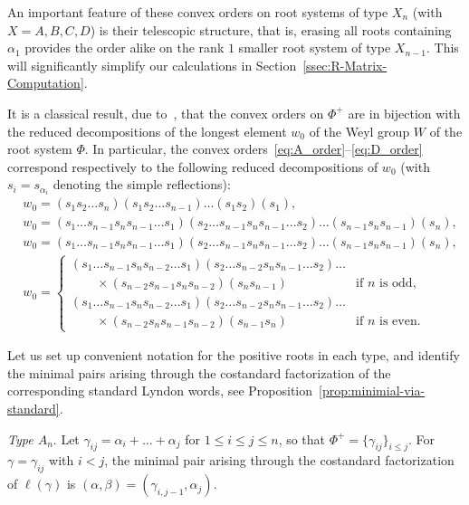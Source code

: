 \documentclass[pdftex]{sigma}
\numberwithin{equation}{section}
\begin{document}
\begin{Remark}\label{rem:tower-like}
An important feature of these convex orders on root systems of type $X_n$ (with $X=A,B,C,D$) is their telescopic structure, that is, erasing all roots containing $\alpha_1$ provides the order alike on the rank $1$ smaller root system of type $X_{n-1}$. This will significantly simplify our calculations in Section~\ref{ssec:R-Matrix-Computation}.
\end{Remark}

\begin{Remark}%
It is a classical result, due to~\cite{P}, that the convex orders on $\Phi^+$ are in bijection with the reduced decompositions of the longest element $w_0$ of the Weyl group $W$ of the root system $\Phi$. In particular, the convex orders~\eqref{eq:A_order}--\eqref{eq:D_order} correspond respectively to the following reduced decompositions of $w_0$
(with $s_{i} = s_{\alpha_{i}}$ denoting the simple reflections):
\begin{align*}
 &w_{0} = (s_{1}s_{2}\dots s_{n})(s_{1}s_{2}\dots s_{n-1})\dots (s_{1}s_{2})(s_{1}), \\
 &w_{0} = (s_{1}\dots s_{n - 1}s_{n}s_{n-1}\dots s_{1})(s_{2}\dots s_{n-1}s_{n}s_{n-1}\dots s_{2})\dots (s_{n-1}s_{n}s_{n-1})(s_{n}), \\
 &w_{0} = (s_{1}\dots s_{n-1}s_{n}s_{n-1}\dots s_{1})(s_{2}\dots s_{n-1}s_{n}s_{n-1}\dots s_{2})\dots (s_{n-1}s_{n}s_{n-1})(s_{n}), \\
 &w_{0} =
 \begin{cases}
 (s_{1}\dots s_{n-1}s_{n}s_{n-2}\dots s_{1})(s_{2}\dots s_{n-2}s_{n}s_{n-1}\dots s_{2})\dots& \\
 \qquad\times{}(s_{n-2}s_{n-1}s_{n}s_{n-2})(s_{n}s_{n-1}) &\text{if $n$ is odd}, \\
 (s_{1}\dots s_{n-1}s_{n}s_{n-2}\dots s_{1})(s_{2}\dots s_{n-2}s_{n}s_{n-1}\dots s_{2})\dots &\\
 \qquad\times{}(s_{n-2}s_{n}s_{n-1}s_{n-2})(s_{n-1}s_{n}) &\text{if $n$ is even}.
 \end{cases}
\end{align*}
\end{Remark}


Let us set up convenient notation for the positive roots in each type, and identify the minimal pairs arising through the costandard factorization of the corresponding standard Lyndon words, see Proposition~\ref{prop:minimial-via-standard}.


\emph{Type $A_n$}.
Let $\gamma_{ij} = \alpha_{i} + \dots + \alpha_{j}$ for $1 \le i \le j \le n$, so that
$\Phi^+=\{\gamma_{ij}\}_{i\leq j}$. For $\gamma=\gamma_{ij}$ with $i < j$, the minimal pair arising through the costandard factorization of $\ell(\gamma)$ is $(\alpha,\beta)=(\gamma_{i,j - 1},\alpha_{j})$.
\end{document}
